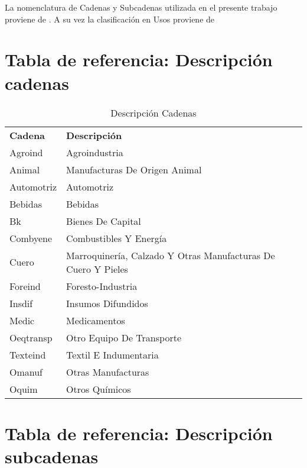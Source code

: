 \documentclass[class=article, crop=false]{standalone}
\begin{document}
La nomenclatura de Cadenas y Subcadenas utilizada en el presente trabajo proviene de \cite{molinari2016especializacion}. A su vez la clasificación en Usos proviene de \cite{flores2008world}
	
\section{Tabla de referencia: Descripción cadenas}



\begin{table}[!ht]
	\begin{tabular}{ll}
		\textbf{Cadena} & \textbf{Descripción} \\
		Agroind & Agroindustria \\
		Animal & Manufacturas De Origen Animal \\
		Automotriz & Automotriz \\
		Bebidas & Bebidas \\
		Bk & Bienes De Capital \\
		Combyene & Combustibles Y Energía \\
		Cuero & Marroquinería, Calzado Y Otras Manufacturas De Cuero Y Pieles \\
		Foreind & Foresto-Industria \\
		Insdif & Insumos Difundidos \\
		Medic & Medicamentos \\
		Oeqtransp & Otro Equipo De Transporte \\
		Texteind & Textil E Indumentaria \\
		Omanuf & Otras Manufacturas \\
		Oquim & Otros Químicos
	\end{tabular}
\caption{Descripción Cadenas}
\label{table:cadenas}
\end{table}



\section{Tabla de referencia: Descripción subcadenas}
\end{document}
